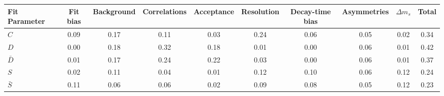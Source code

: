 \begin{tabular}{l  c  c  c  c  c  c  c  c  | c }
\hline
\hline
Fit Parameter & Fit bias & Background & Correlations & Acceptance & Resolution & Decay-time bias & Asymmetries & $\Delta m_{s}$ &  Total  \\ 
\hline
$C$ & 0.09 & 0.17 & 0.11 & 0.03 & 0.24 & 0.06 & 0.05 & 0.02 & 0.34 \\ 
$D$ & 0.00 & 0.18 & 0.32 & 0.18 & 0.01 & 0.00 & 0.06 & 0.01 & 0.42 \\ 
$\bar{D}$ & 0.01 & 0.17 & 0.24 & 0.22 & 0.03 & 0.00 & 0.06 & 0.01 & 0.37 \\ 
$S$ & 0.02 & 0.11 & 0.04 & 0.01 & 0.12 & 0.10 & 0.06 & 0.12 & 0.24 \\ 
$\bar{S}$ & 0.11 & 0.06 & 0.06 & 0.02 & 0.09 & 0.08 & 0.05 & 0.12 & 0.23 \\ 
\hline
\hline
\end{tabular}
